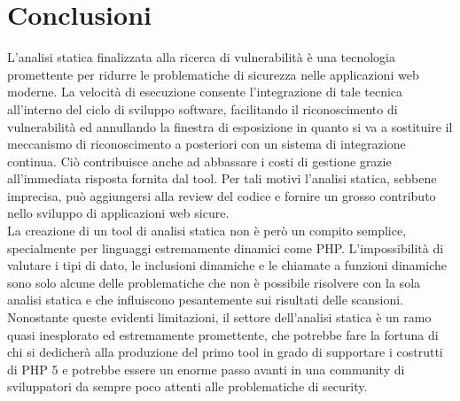 \chapter{Conclusioni}
L'analisi statica finalizzata alla ricerca di vulnerabilità è una tecnologia promettente per ridurre le problematiche di sicurezza nelle applicazioni web moderne. La velocità di esecuzione consente l'integrazione di tale tecnica all'interno del ciclo di sviluppo software, facilitando il riconoscimento di vulnerabilità ed annullando la finestra di esposizione in quanto si va a sostituire il meccanismo di riconoscimento a posteriori con un sistema di integrazione continua. Ciò contribuisce anche ad abbassare i costi di gestione grazie all'immediata risposta fornita dal tool.
Per tali motivi l'analisi statica, sebbene imprecisa, può aggiungersi alla review del codice e fornire un grosso contributo nello sviluppo di applicazioni web sicure.\\
La creazione di un tool di analisi statica non è però un compito semplice, specialmente per linguaggi estremamente dinamici come PHP. L'impossibilità di valutare i tipi di dato, le inclusioni dinamiche e le chiamate a funzioni dinamiche sono solo alcune delle problematiche che non è possibile risolvere con la sola analisi statica e che influiscono pesantemente sui risultati delle scansioni.\\
Nonostante queste evidenti limitazioni, il settore dell'analisi statica è un ramo quasi inesplorato ed estremamente promettente, che potrebbe fare la fortuna di chi si dedicherà alla produzione del primo tool in grado di supportare i costrutti di PHP 5 e potrebbe essere un enorme passo avanti in una community di sviluppatori da sempre poco attenti alle problematiche di security.